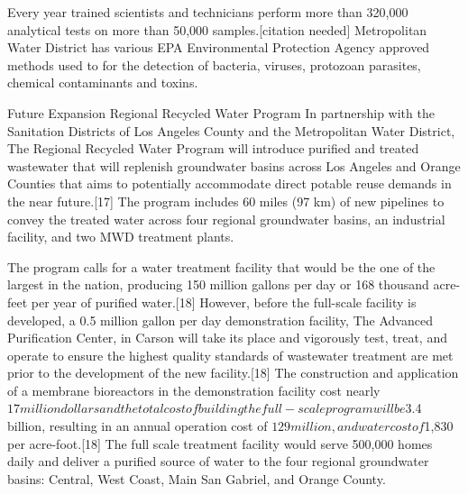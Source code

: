 \documentclass{article}
\begin{document}
Every year trained scientists and technicians perform more than 320,000 analytical tests on more than 50,000 samples.[citation needed] Metropolitan Water District has various EPA Environmental Protection Agency approved methods used to for the detection of bacteria, viruses, protozoan parasites, chemical contaminants and toxins.

Future Expansion
Regional Recycled Water Program
In partnership with the Sanitation Districts of Los Angeles County and the Metropolitan Water District, The Regional Recycled Water Program will introduce purified and treated wastewater that will replenish groundwater basins across Los Angeles and Orange Counties that aims to potentially accommodate direct potable reuse demands in the near future.[17] The program includes 60 miles (97 km) of new pipelines to convey the treated water across four regional groundwater basins, an industrial facility, and two MWD treatment plants.

The program calls for a water treatment facility that would be the one of the largest in the nation, producing 150 million gallons per day or 168 thousand acre-feet per year of purified water.[18] However, before the full-scale facility is developed, a 0.5 million gallon per day demonstration facility, The Advanced Purification Center, in Carson will take its place and vigorously test, treat, and operate to ensure the highest quality standards of wastewater treatment are met prior to the development of the new facility.[18] The construction and application of a membrane bioreactors in the demonstration facility cost nearly $17 million dollars and the total cost of building the full-scale program will be $3.4 billion, resulting in an annual operation cost of $129 million, and water cost of $1,830 per acre-foot.[18] The full scale treatment facility would serve 500,000 homes daily and deliver a purified source of water to the four regional groundwater basins: Central, West Coast, Main San Gabriel, and Orange County.
\end{document}
